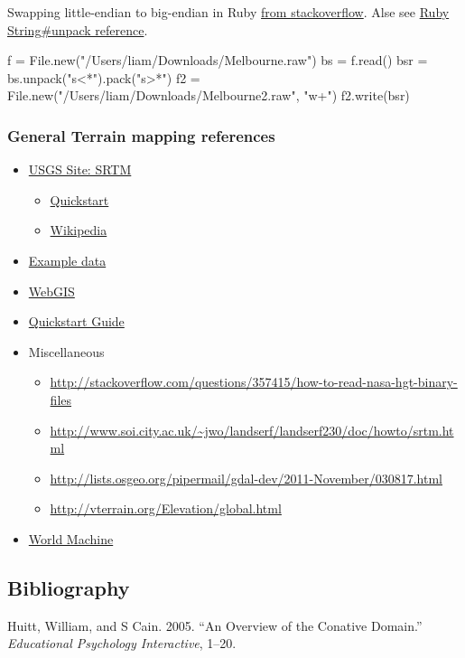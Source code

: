 \documentclass[]{article}
\newenvironment{Shaded}{}{}
\newcommand{\DataTypeTok}[1]{\textcolor[rgb]{0.56,0.13,0.00}{{#1}}}
\newcommand{\StringTok}[1]{\textcolor[rgb]{0.25,0.44,0.63}{{#1}}}
\newcommand{\NormalTok}[1]{{#1}}
\begin{document}
Swapping little-endian to big-endian in Ruby
\href{http://stackoverflow.com/questions/16077885/how-to-convert-to-big-endian-in-ruby}{from
stackoverflow}. Alse see
\href{http://www.ruby-doc.org/core-2.1.2/String.html\#method-i-unpack}{Ruby
String\#unpack reference}.

\begin{Shaded}
\begin{Highlighting}[]

\NormalTok{f = }\DataTypeTok{File}\NormalTok{.new(}\StringTok{"/Users/liam/Downloads/Melbourne.raw"}\NormalTok{)}
\NormalTok{bs = f.read()}
\NormalTok{bsr = bs.unpack(}\StringTok{"s<*"}\NormalTok{).pack(}\StringTok{"s>*"}\NormalTok{)}
\NormalTok{f2 = }\DataTypeTok{File}\NormalTok{.new(}\StringTok{"/Users/liam/Downloads/Melbourne2.raw"}\NormalTok{, }\StringTok{"w+"}\NormalTok{)}
\NormalTok{f2.write(bsr)}
\end{Highlighting}
\end{Shaded}

\subsubsection{General Terrain mapping
references}\label{terrainux5freferences}

\begin{itemize}
\itemsep1pt\parskip0pt
\item
  \href{https://lta.cr.usgs.gov/SRTM2}{USGS Site: SRTM}

  \begin{itemize}
  \itemsep1pt\parskip0pt
  \item
    \href{http://dds.cr.usgs.gov/srtm/version2_1/Documentation/Quickstart.pdf}{Quickstart}
  \item
    \href{http://en.wikipedia.org/wiki/Shuttle_Radar_Topography_Mission}{Wikipedia}
  \end{itemize}
\item
  \href{http://www.ga.gov.au/metadata-gateway/metadata/record/gcat_66006}{Example
  data}
\item
  \href{http://www.webgis.com/srtm3.html}{WebGIS}
\item
  \href{http://dds.cr.usgs.gov/srtm/version2_1/Documentation/Quickstart.pdf}{Quickstart
  Guide}
\item
  Miscellaneous

  \begin{itemize}
  \itemsep1pt\parskip0pt
  \item
    \url{http://stackoverflow.com/questions/357415/how-to-read-nasa-hgt-binary-files}
  \item
    \url{http://www.soi.city.ac.uk/~jwo/landserf/landserf230/doc/howto/srtm.html}
  \item
    \url{http://lists.osgeo.org/pipermail/gdal-dev/2011-November/030817.html}
  \item
    \url{http://vterrain.org/Elevation/global.html}
  \end{itemize}
\item
  \href{http://www.world-machine.com/}{World Machine}
\end{itemize}

\subsection*{Bibliography}\label{bibliography}

Huitt, William, and S Cain. 2005. ``An Overview of the Conative
Domain.'' \emph{Educational Psychology Interactive}, 1--20.
\end{document}
